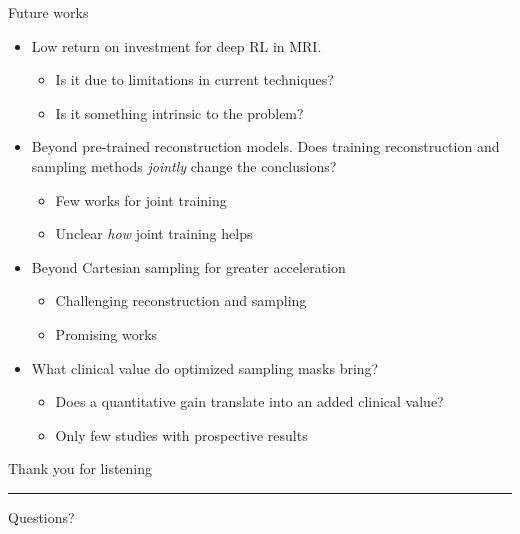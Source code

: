 \begin{frame}{Future works}
    \begin{itemize}
        \item Low return on investment for deep RL in MRI.
        \begin{itemize}
            \item Is it due to limitations in current techniques?
            \item Is it something intrinsic to the problem?
        \end{itemize}\pause
        \item Beyond pre-trained reconstruction models. Does training reconstruction and sampling methods \textit{jointly} change the conclusions?
        \begin{itemize}
            \item Few works for joint training \parencite{jin2019self,van2021active,yin2021end}
            \item Unclear \textit{how} joint training helps
        \end{itemize}\pause
        \item Beyond Cartesian sampling for greater acceleration
        \begin{itemize}
            \item Challenging reconstruction and sampling
            \item Promising works \parencite{lazarus2019sparkling,weiss2019pilot,wang2021b,chaithya2022benchmarking}
        \end{itemize}\pause
        \item What clinical value do optimized sampling masks bring? 
        \begin{itemize}
            \item Does a quantitative gain translate into an added clinical value?  
            \item Only few studies with prospective results \parencite{lazarus2019sparkling,zibetti2020fast,yu2022validation}
        \end{itemize}
    \end{itemize}
\end{frame}
\addtocounter{framenumber}{-1}
\begin{frame}[noframenumbering]
    \centering
    {\fontsize{24pt}{25}\selectfont
    Thank you for listening\\[3mm]}
    \rule{0.7\textwidth}{.8pt}

    {\vspace{6mm}\fontsize{18pt}{20}\selectfont Questions?}
\end{frame}


